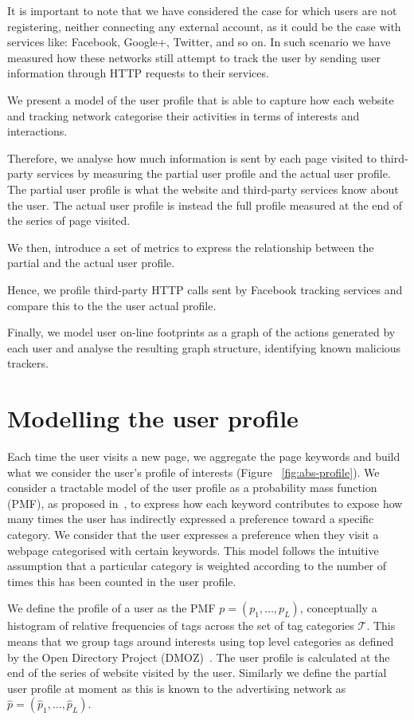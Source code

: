 It is important to note that we have considered the case for which users are not registering, neither connecting any external account, as it could be the case with services like: Facebook, Google+, Twitter, and so on. In such scenario we have measured how these networks still attempt to track the user by sending user information through HTTP requests to their services.

We present a model of the user profile that is able to capture how each website and tracking network categorise their activities in terms of interests and interactions.

Therefore, we analyse how much information is sent by each page visited to third-party services by measuring the partial user profile and the actual user profile. The partial user profile is what the website and third-party services know about the user. The actual user profile is instead the full profile measured at the end of the series of page visited.

We then, introduce a set of metrics to express the relationship between the partial and the actual user profile.

Hence, we profile third-party HTTP calls sent by Facebook tracking services and compare this to the the user actual profile.

Finally, we model user on-line footprints as a graph of the actions generated by each user and analyse the resulting graph structure, identifying known malicious trackers.

\section{Modelling the user profile}
\label{sec:mod-profile}
\noindent
Each time the user visits a new page, we aggregate the page keywords and build what we consider the user's profile of interests (Figure ~\ref{fig:abs-profile}). We consider a tractable model of the user profile as a probability mass function (PMF), as proposed in~\cite{Parra12DKE,Parra12TKDE}, to express how each keyword contributes to expose how many times the user has indirectly expressed a preference toward a specific category. We consider that the user expresses a preference when they visit a webpage categorised with certain keywords. This model follows the intuitive assumption that a particular category is weighted according to the number of times this has been counted in the user profile.

We define the profile of a user as the PMF $p = (p_1,\ldots, p_L)$, conceptually a histogram of relative frequencies of tags across the set of tag categories $\mathcal{T}$. This means that we group tags around interests using top level categories as defined by the Open Directory Project (DMOZ)~\cite{a22}.
The user profile is calculated at the end of the series of website visited by the user. Similarly we define the partial user profile at moment as this is known to the advertising network as  $\hat{p} = (\hat{p}_1,\ldots, \hat{p}_L)$.

